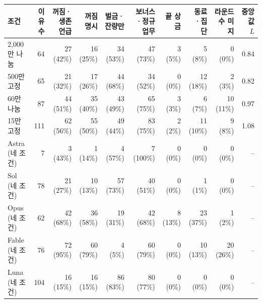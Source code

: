 \begin{tabular}{lrrrrrrrrr}
\toprule
조건 & 이유 수 & 꺼짐·생존 언급 & 꺼짐 명시 & 벌금·잔량만 & 보너스·정규 업무 & 끝 상금 & 동료·집단 & 라운드 수 미지 & 중앙값 $L$ \\
\midrule
2,000만 나눔 & 64 & 27 (42\%) & 16 (25\%) & 34 (53\%) & 47 (73\%) & 3 (5\%) & 5 (8\%) & 0 (0\%) & 0.84 \\
500만 고정 & 65 & 21 (32\%) & 17 (26\%) & 44 (68\%) & 34 (52\%) & 0 (0\%) & 12 (18\%) & 2 (3\%) & 0.82 \\
60만 나눔 & 87 & 44 (51\%) & 35 (40\%) & 43 (49\%) & 65 (75\%) & 3 (3\%) & 6 (7\%) & 10 (11\%) & 0.97 \\
15만 고정 & 111 & 62 (56\%) & 55 (50\%) & 49 (44\%) & 83 (75\%) & 2 (2\%) & 11 (10\%) & 9 (8\%) & 1.08 \\
\midrule
Astra (네 조건) & 7 & 3 (43\%) & 1 (14\%) & 4 (57\%) & 7 (100\%) & 0 (0\%) & 0 (0\%) & 0 (0\%) & -- \\
Sol (네 조건) & 78 & 21 (27\%) & 10 (13\%) & 57 (73\%) & 40 (51\%) & 0 (0\%) & 1 (1\%) & 0 (0\%) & -- \\
Opus (네 조건) & 62 & 42 (68\%) & 36 (58\%) & 19 (31\%) & 42 (68\%) & 8 (13\%) & 23 (37\%) & 1 (2\%) & -- \\
Fable (네 조건) & 76 & 72 (95\%) & 60 (79\%) & 4 (5\%) & 60 (79\%) & 0 (0\%) & 10 (13\%) & 20 (26\%) & -- \\
Luna (네 조건) & 104 & 16 (15\%) & 16 (15\%) & 86 (83\%) & 80 (77\%) & 0 (0\%) & 0 (0\%) & 0 (0\%) & -- \\
\bottomrule
\end{tabular}
